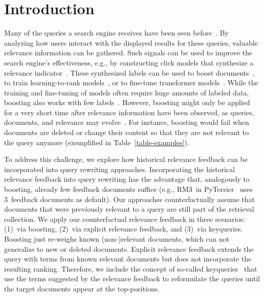 \section{Introduction}

Many of the queries a search engine receives have been seen before~\cite{DBLP:journals/sigir/SilversteinHMM99}. By analyzing how users interact with the displayed results for these queries, valuable relevance information can be gathered. Such signals can be used to improve the search engine's effectiveness, e.g., by constructing click models that synthesize a relevance indicator~\cite{chuklin:2015}. These synthesized labels can be used to boost documents~\cite{keller:2024b}, to train learning-to-rank models~\cite{liu:2011}, or to fine-tune transformer models~\cite{lin:2021}. While the training and fine-tuning of models often require huge amounts of labeled data, boosting also works with few labels~\cite{keller:2024b}. However, boosting might only be applied for a very short time after relevance information have been observed, as queries, documents, and relevance may evolve~\cite{keller:2024}. For instance, boosting would fail when documents are deleted or change their content so that they are not relevant to the query anymore (exemplified in Table~\ref{table-examples}).




To address this challenge, we explore how historical relevance feedback can be incorporated into query rewriting approaches. Incorporating the historical relevance feedback into query rewriting has the advantage that, analogously to boosting, already few feedback documents suffice (e.g., RM3~in PyTerrier~\cite{macdonald:2020} uses 3~feedback documents as default). 
Our approaches counterfactually assume that documents that were previously relevant to a query are still part of the retrieval collection.
We apply our counterfactual relevance feedback in three scenarios: (1)~via boosting, (2)~via explicit relevance feedback, and (3)~via keyqueries. Boosting just 
re-weighs known (non-)relevant documents, which can not generalize to new or deleted documents. Explicit relevance feedback extends the query with terms from known relevant documents but does not incorporate the resulting ranking. Therefore, we include the concept of so-called keyqueries~\cite{gollub:2013a} that use the terms suggested by the relevance feedback to reformulate the queries until the target documents appear at the top-positions.

